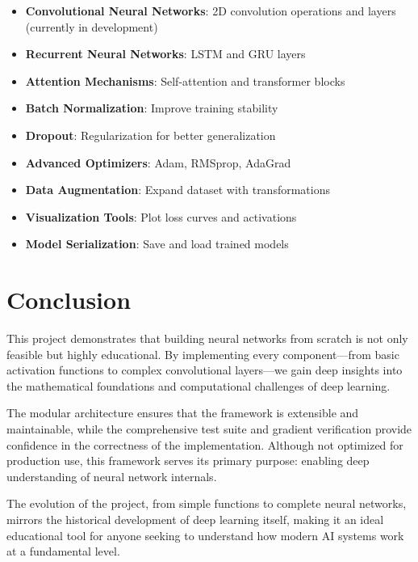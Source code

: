 \documentclass[12pt,a4paper]{article}
\begin{document}
\begin{itemize}
    \item \textbf{Convolutional Neural Networks}: 2D convolution operations and layers (currently in development)
    \item \textbf{Recurrent Neural Networks}: LSTM and GRU layers
    \item \textbf{Attention Mechanisms}: Self-attention and transformer blocks
    \item \textbf{Batch Normalization}: Improve training stability
    \item \textbf{Dropout}: Regularization for better generalization
    \item \textbf{Advanced Optimizers}: Adam, RMSprop, AdaGrad
    \item \textbf{Data Augmentation}: Expand dataset with transformations
    \item \textbf{Visualization Tools}: Plot loss curves and activations
    \item \textbf{Model Serialization}: Save and load trained models
\end{itemize}

\section{Conclusion}

This project demonstrates that building neural networks from scratch is not only feasible but highly educational. By implementing every component—from basic activation functions to complex convolutional layers—we gain deep insights into the mathematical foundations and computational challenges of deep learning.

The modular architecture ensures that the framework is extensible and maintainable, while the comprehensive test suite and gradient verification provide confidence in the correctness of the implementation. Although not optimized for production use, this framework serves its primary purpose: enabling deep understanding of neural network internals.

The evolution of the project, from simple functions to complete neural networks, mirrors the historical development of deep learning itself, making it an ideal educational tool for anyone seeking to understand how modern AI systems work at a fundamental level.


\appendix
\end{document}
